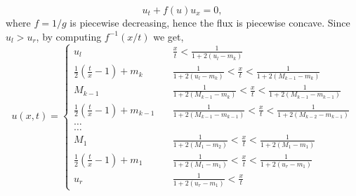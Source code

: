 \documentclass[12pt]{article}
\newcommand{\1}{\mathds{1}}
\theoremstyle{definition}
\begin{document}
\begin{equation}\label{eq: flux}
    u_t+f(u)u_x=0,
\end{equation} where $f=1/g$ is piecewise decreasing, hence the flux is piecewise concave. Since $u_l>u_r$, by computing $f^{-1}(x/t)$ we get, \begin{equation}\label{eq: uRP}
    u(x,t) = \begin{cases}
        u_l & \quad \frac{x}{t}< \frac{1}{1+2(u_l-m_k)} \\ 
        \frac{1}{2}\left(\frac{t}{x}-1\right)+m_k  &\quad \frac{1}{1+2(u_l-m_k)} < \frac{x}{t} < \frac{1}{1+2(M_{k-1}-m_k)}\\
        M_{k-1} &\quad \frac{1}{1+2(M_{k-1}-m_k)} < \frac{x}{t} < \frac{1}{1+2(M_{k-1}-m_{k-1})}\\
        \frac{1}{2}\left(\frac{t}{x}-1\right)+m_{k-1}  &\quad \frac{1}{1+2(M_{k-1}-m_{k-1})} < \frac{x}{t} < \frac{1}{1+2(M_{k-2}-
m_{k-1})}\\
        \dots\\
        \dots\\
        M_1 &\quad \frac{1}{1+2(M_1-m_2)} < \frac{x}{t} < \frac{1}{1+2(M_1-m_1)}\\
        \frac{1}{2}\left(\frac{t}{x}-1\right)+m_1  &\quad \frac{1}{1+2(M_1-m_1)} < \frac{x}{t} < \frac{1}{1+2(u_r-m_1)}\\
        u_r &\quad \frac{1}{1+2(u_r-m_1)}<\frac{x}{t}
    \end{cases}
\end{equation}
\end{document}
